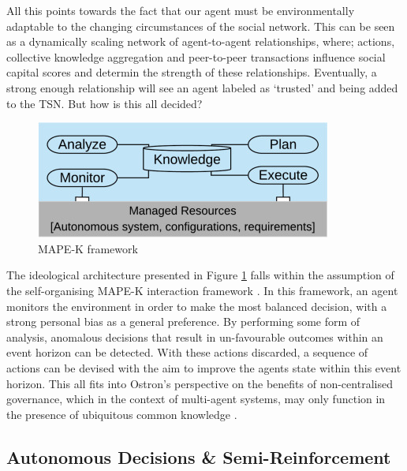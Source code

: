         All this points towards the fact that our agent must be environmentally adaptable to the changing circumstances of the social network. This can be seen as a dynamically scaling network of agent-to-agent relationships, where; actions, collective knowledge aggregation and peer-to-peer transactions influence social capital scores and determin the strength of these relationships. Eventually, a strong enough relationship will see an agent labeled as `trusted' and being added to the TSN. But how is this all decided? 


        \begin{figure}[htb]
            \centering
            \includegraphics{006_team_3_agent_design/FIGS/mapek.jpg}
            \caption{MAPE-K framework}
            \label{fig:mapek_framework}
        \end{figure}

        The ideological architecture presented in Figure \ref{fig:mapek_framework} falls within the assumption of the self-organising MAPE-K interaction framework \cite{mapek}. In this framework, an agent monitors the environment in order to make the most balanced decision, with a strong personal bias as a general preference. By performing some form of analysis, anomalous decisions that result in un-favourable outcomes within an event horizon can be detected. With these actions discarded, a sequence of actions can be devised with the aim to improve the agents state within this event horizon. This all fits into Ostron's perspective on the benefits of non-centralised governance, which in the context of multi-agent systems, may only function in the presence of ubiquitous common knowledge \cite{pitt}. 
        


        
        
    \subsection{Autonomous Decisions \& Semi-Reinforcement}

